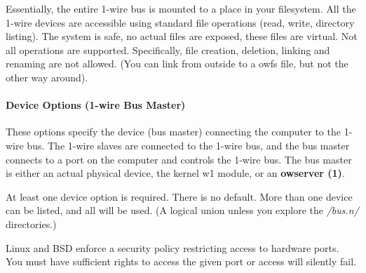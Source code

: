 Essentially,
the entire 1-wire bus is mounted to a place in your filesystem. All the 1-wire
devices are accessible using standard file operations (read, write, directory
listing). The system is safe, no actual files are exposed, these files are
virtual. Not all operations are supported. Specifically, file creation, deletion,
linking and renaming are not allowed. (You can link from outside to a owfs
file, but not the other way around).           
\paragraph*{Device Options (1-wire Bus
Master)}
These options specify the device (bus master) connecting the computer
to the 1-wire bus. The 1-wire slaves are connected to the 1-wire bus, and the
bus master connects to a port on the computer and controls the 1-wire bus.
The bus master is either an actual physical device, the kernel w1 module,
or an  \textsf{\textbf{owserver (1)}. } 

At least one device option is required. There is no
default. More than one device can be listed, and all will be used. (A logical
union unless you explore the \textit{/bus.n/} directories.) 

Linux and BSD enforce
a security policy restricting access to hardware ports. You must have sufficient
rights to access the given port or access will silently fail. 
